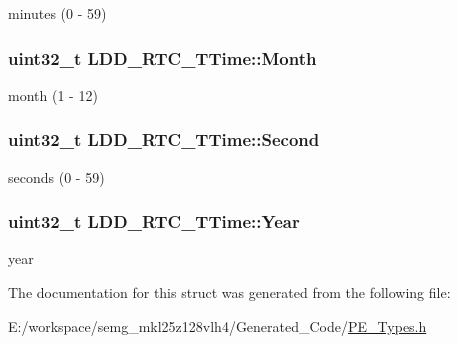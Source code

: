 minutes (0 -\/ 59) \hypertarget{struct_l_d_d___r_t_c___t_time_a2de1da3c8e42665975c2469125b04dfd}{
\subsubsection[{Month}]{\setlength{\rightskip}{0pt plus 5cm}uint32\-\_\-t L\-D\-D\-\_\-\-R\-T\-C\-\_\-\-T\-Time\-::\-Month}}\label{struct_l_d_d___r_t_c___t_time_a2de1da3c8e42665975c2469125b04dfd}
month (1 -\/ 12) \hypertarget{struct_l_d_d___r_t_c___t_time_ab6c770706c18542e856d56398850ac9e}{
\subsubsection[{Second}]{\setlength{\rightskip}{0pt plus 5cm}uint32\-\_\-t L\-D\-D\-\_\-\-R\-T\-C\-\_\-\-T\-Time\-::\-Second}}\label{struct_l_d_d___r_t_c___t_time_ab6c770706c18542e856d56398850ac9e}
seconds (0 -\/ 59) \hypertarget{struct_l_d_d___r_t_c___t_time_a16fbfb74b239e4b5e1889fe19d025d5e}{
\subsubsection[{Year}]{\setlength{\rightskip}{0pt plus 5cm}uint32\-\_\-t L\-D\-D\-\_\-\-R\-T\-C\-\_\-\-T\-Time\-::\-Year}}\label{struct_l_d_d___r_t_c___t_time_a16fbfb74b239e4b5e1889fe19d025d5e}
year 

The documentation for this struct was generated from the following file\-:\begin{DoxyCompactItemize}
\item 
E\-:/workspace/semg\-\_\-mkl25z128vlh4/\-Generated\-\_\-\-Code/\hyperlink{_p_e___types_8h}{P\-E\-\_\-\-Types.\-h}\end{DoxyCompactItemize}
